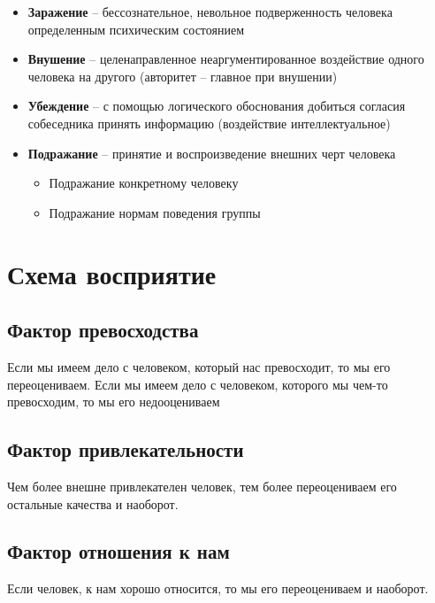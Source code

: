 \begin{itemize}
    \item \textbf{Заражение} --
        бессознательное, невольное подверженность
        человека определенным психическим состоянием
    \item \textbf{Внушение} --
        целенаправленное неаргументированное
        воздействие одного человека на другого
        (авторитет -- главное при внушении)
    \item \textbf{Убеждение} --
        с помощью логического обоснования
        добиться согласия собеседника принять информацию
        (воздействие интеллектуальное)
    \item \textbf{Подражание} --
        принятие и воспроизведение внешних черт человека

        \begin{itemize}
            \item Подражание конкретному человеку
            \item Подражание нормам поведения группы
        \end{itemize}
\end{itemize}

\section{Схема восприятие}

\subsection{Фактор превосходства}

Если мы имеем дело с человеком, который нас превосходит, то мы его
переоцениваем.
Если мы имеем дело с человеком, которого мы чем-то превосходим,
то мы его недооцениваем

\subsection{Фактор привлекательности}

Чем более внешне привлекателен человек, тем более переоцениваем
его остальные качества и наоборот.

\subsection{Фактор отношения к нам}

Если человек, к нам хорошо относится, то мы его переоцениваем и
наоборот.

